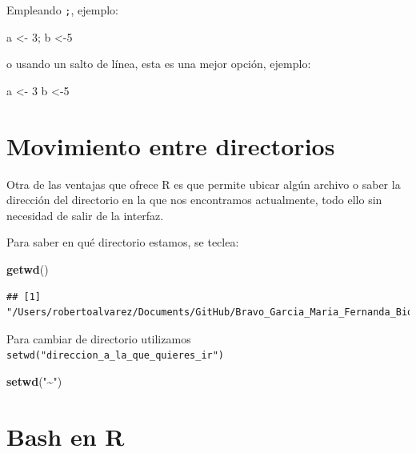 \documentclass[
]{book}
\newenvironment{Shaded}{\begin{snugshade}}{\end{snugshade}}
\newcommand{\DecValTok}[1]{\textcolor[rgb]{0.00,0.00,0.81}{#1}}
\newcommand{\FunctionTok}[1]{\textcolor[rgb]{0.13,0.29,0.53}{\textbf{#1}}}
\newcommand{\NormalTok}[1]{#1}
\newcommand{\OtherTok}[1]{\textcolor[rgb]{0.56,0.35,0.01}{#1}}
\newcommand{\StringTok}[1]{\textcolor[rgb]{0.31,0.60,0.02}{#1}}
\begin{document}
Empleando \texttt{;}, ejemplo:

\begin{Shaded}
\begin{Highlighting}[]
\NormalTok{a }\OtherTok{\textless{}{-}} \DecValTok{3}\NormalTok{; b }\OtherTok{\textless{}{-}}\DecValTok{5}
\end{Highlighting}
\end{Shaded}

o usando un salto de línea, esta es una mejor opción, ejemplo:

\begin{Shaded}
\begin{Highlighting}[]
\NormalTok{a }\OtherTok{\textless{}{-}} \DecValTok{3}
\NormalTok{b }\OtherTok{\textless{}{-}}\DecValTok{5}
\end{Highlighting}
\end{Shaded}

\section{Movimiento entre directorios}\label{movimiento-entre-directorios}

Otra de las ventajas que ofrece R es que permite ubicar algún archivo o saber la dirección del directorio en la que nos encontramos actualmente, todo ello sin necesidad de salir de la interfaz.

Para saber en qué directorio estamos, se teclea:

\begin{Shaded}
\begin{Highlighting}[]
\FunctionTok{getwd}\NormalTok{()}
\end{Highlighting}
\end{Shaded}

\begin{verbatim}
## [1] "/Users/robertoalvarez/Documents/GitHub/Bravo_Garcia_Maria_Fernanda_Bioinfo_2024"
\end{verbatim}

Para cambiar de directorio utilizamos \texttt{setwd("direccion\_a\_la\_que\_quieres\_ir")}

\begin{Shaded}
\begin{Highlighting}[]
\FunctionTok{setwd}\NormalTok{(}\StringTok{"\textasciitilde{}"}\NormalTok{)}
\end{Highlighting}
\end{Shaded}

\section{Bash en R}\label{bash-en-r}
\end{document}
